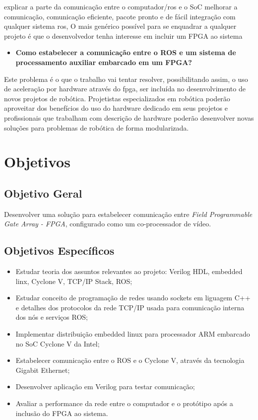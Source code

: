 explicar a parte da comunicação entre o computador/ros e o SoC melhorar a comunicação, comunicação eficiente, pacote pronto e de fácil integração com qualquer sistema ros, O mais genérico possível para se enquadrar a qualquer projeto é que o desenvolvedor tenha interesse em incluir um FPGA ao sistema



\begin{itemize}
    \item \textbf{Como estabelecer a comunicação entre o ROS e um sistema de processamento auxiliar 
embarcado em um FPGA?}

\end{itemize}

Este problema é o que o trabalho vai tentar resolver, possibilitando assim, o uso de aceleração por hardware através do fpga, ser incluída no desenvolvimento de novos projetos de robótica. Projetistas especializados em robótica poderão aproveitar dos benefícios do uso do hardware dedicado em seus projetos e profissionais que trabalham com descrição de hardware poderão desenvolver novas soluções para problemas de robótica de forma modularizada. 




\section{Objetivos}

\subsection{Objetivo Geral}

Desenvolver uma solução para estabelecer comunicação entre \textit{Field Programmable Gate Array - FPGA}, 
configurado como um co-processador de vídeo.

\subsection{Objetivos Específicos}

\begin{itemize}
    \item Estudar teoria dos assuntos relevantes ao projeto: Verilog HDL, embedded linx,  Cyclone V, 
    TCP/IP Stack, ROS\@;
    \item Estudar conceito de programação de redes usando sockets em liguagem C++ e detalhes dos protocolos da rede TCP/IP usada para comunicação interna dos nós e serviços ROS\@;
    \item Implementar distribuição embedded linux para processador ARM embarcado no SoC Cyclone V da Intel;
    \item Estabelecer comunicação entre o ROS e o Cyclone V, através da tecnologia Gigabit Ethernet;
    \item Desenvolver aplicação em Verilog para testar comunicação;
    \item Avaliar a performance da rede entre o computador e o protótipo após a inclusão do FPGA ao sistema.
\end{itemize}


